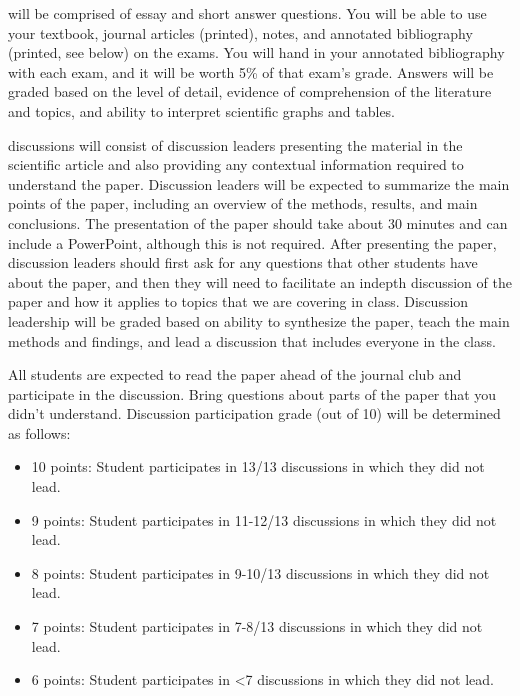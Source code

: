 \documentclass{tufte-handout}
\begin{document}
\begin{fullwidth}




 will be comprised of essay and short answer questions. You will be able to use your textbook, journal articles (printed), notes, and annotated bibliography (printed, see below) on the exams. You will hand in your annotated bibliography with each exam, and it will be worth 5\% of that exam's grade. Answers will be graded based on the level of detail, evidence of comprehension of the literature and topics, and ability to interpret scientific graphs and tables. 

 discussions will consist of discussion leaders presenting the material in the scientific article and also providing any contextual information required to understand the paper. Discussion leaders will be expected to summarize the main points of the paper, including an overview of the methods, results, and main conclusions. The presentation of the paper should take about 30 minutes and can include a PowerPoint, although this is not required. After presenting the paper, discussion leaders should first ask for any questions that other students have about the paper, and then they will need to facilitate an indepth discussion of the paper and how it applies to topics that we are covering in class. Discussion leadership will be graded based on ability to synthesize the paper, teach the main methods and findings, and lead a discussion that includes everyone in the class. 

All students are expected to read the paper ahead of the journal club and participate in the discussion. Bring questions about parts of the paper that you didn't understand. Discussion participation grade (out of 10) will be determined as follows:

\begin{itemize}
\item 10 points: Student participates in 13/13 discussions in which they did not lead. 
\item 9 points: Student participates in 11-12/13 discussions in which they did not lead. 
\item 8 points: Student participates in 9-10/13 discussions in which they did not lead.
\item 7 points: Student participates in 7-8/13 discussions in which they did not lead.
\item 6 points: Student participates in <7 discussions in which they did not lead.
\end{itemize}


\end{fullwidth}
\end{document}
